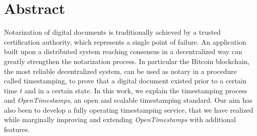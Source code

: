 \chapter{Abstract}
Notarization of digital documents is traditionally achieved by a trusted certification authority, which represents a single point of failure. An application built upon a distributed system reaching consensus in a decentralized way can greatly strengthen the notarization process. In particular the Bitcoin blockchain, the most reliable decentralized system, can be used as notary in a procedure called timestamping, to prove that a digital document existed prior to a certain time $t$ and in a certain state. In this work, we explain the timestamping process and \textit{OpenTimestamps}, an open and scalable timestamping standard. Our aim has also been to develop a fully operating timestamping service, that we have realized while marginally improving and extending \textit{OpenTimestamps} with additional features.
